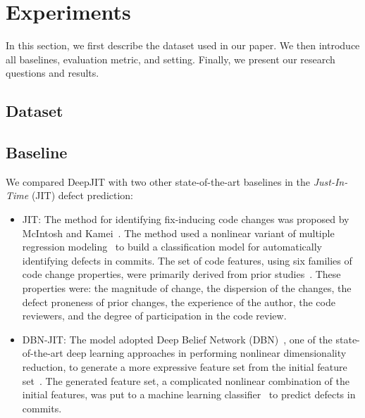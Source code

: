 \section{Experiments}
\label{sec:exp}
In this section, we first describe the dataset used in our paper. We then introduce all baselines, evaluation metric, and setting. Finally, we present our research questions and results.

\subsection{Dataset}
\label{sec:dataset}

\subsection{Baseline}
\label{sec:baseline}
We compared DeepJIT with two other state-of-the-art baselines in the \emph{Just-In-Time} (JIT) defect prediction:
\begin{itemize}
\item JIT: The method for identifying fix-inducing code changes was proposed by McIntosh and Kamei~\cite{mcintosh2018fix}. The method used a nonlinear variant of multiple regression modeling~\cite{fox1997applied} to build a classification model for automatically identifying defects in commits. The set of code features, using six families of code change properties, were primarily derived from prior studies~\cite{Kamei:2013:LES, Kim:2008:CSC, Kononenko:2015, Mockus2000}. These properties were: the magnitude of change, the dispersion of the changes, the defect proneness of prior changes, the experience of the author, the code reviewers, and the degree of participation in the code review. 
\item DBN-JIT: The model adopted Deep Belief Network (DBN)~\cite{hinton2006reducing}, one of the state-of-the-art deep learning approaches in performing nonlinear dimensionality reduction, to generate a more expressive feature set from the initial feature set~\cite{Yang:2015:DLJ}. The generated feature set, a complicated nonlinear combination of the initial features, was put to a machine learning classifier~\cite{nasrabadi2007pattern} to predict defects in commits. 
\end{itemize}

